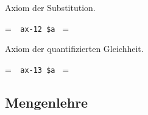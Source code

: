 \noindent Axiom der Substitution.

\setbox\startprefix=\hbox{\tt \ \ ax-12\ \$a\ }
\setbox\contprefix=\hbox{\tt \ \ \ \ \ \ \ \ \ \ \ }
\startm
\m{\vdash}\m{(}\m{\lnot}\m{\forall}\m{=}\m{\rightarrow}\m{(}
\m{=}\m{\rightarrow}\m{(}\m{\varphi}\m{\rightarrow}\m{\forall}\m{(}
\m{=}\m{\rightarrow}\m{\varphi}\m{)}\m{)}\m{)}\m{)}
\endm

\noindent Axiom der quantifizierten Gleichheit.

\setbox\startprefix=\hbox{\tt \ \ ax-13\ \$a\ }
\setbox\contprefix=\hbox{\tt \ \ \ \ \ \ \ \ \ \ \ }
\startm
\m{\vdash}\m{(}\m{\lnot}\m{\forall}\m{=}\m{\rightarrow}\m{(}
\m{\lnot}\m{\forall}\m{=}\m{\rightarrow}\m{(}\m{=}
\m{\rightarrow}\m{\forall}\m{=}\m{)}\m{)}\m{)}
\endm

%
%
%
%

%

\subsection{Mengenlehre}\label{mmsettheoryaxioms}

